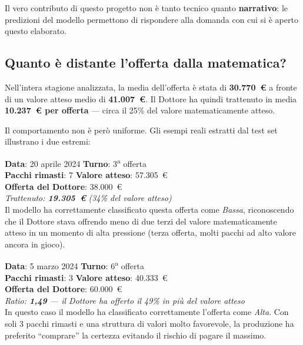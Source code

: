 \documentclass[12pt, a4paper]{article}
\begin{document}
Il vero contributo di questo progetto non è tanto tecnico quanto
\textbf{narrativo}: le predizioni del modello permettono di rispondere
alla domanda con cui si è aperto questo elaborato.

\subsection{Quanto è distante l'offerta dalla matematica?}

Nell'intera stagione analizzata, la media dell'offerta è stata di \textbf{30.770~€}
a fronte di un valore atteso medio di \textbf{41.007~€}. Il Dottore ha quindi
trattenuto in media \textbf{10.237~€ per offerta} — circa il 25\% del valore
matematicamente atteso.

Il comportamento non è però uniforme. Gli esempi reali estratti dal test set
illustrano i due estremi:

\begin{tcolorbox}[colback=rossoat!6, colframe=rossoat!60!black,
  fonttitle=\bfseries\small, title=Offerta classificata come BASSA --- esempio reale]
\small
\textbf{Data}: 20 aprile 2024 \quad \textbf{Turno}: 3\textsuperscript{a} offerta\\
\textbf{Pacchi rimasti}: 7 \quad \textbf{Valore atteso}: 57.305~€\\
\textbf{Offerta del Dottore}: 38.000~€\\
\textit{Trattenuto: \textbf{19.305~€} (34\% del valore atteso)}\\[4pt]
Il modello ha correttamente classificato questa offerta come \textit{Bassa},
riconoscendo che il Dottore stava offrendo meno di due terzi del valore
matematicamente atteso in un momento di alta pressione (terza offerta,
molti pacchi ad alto valore ancora in gioco).
\end{tcolorbox}

\vspace{0.5cm}

\begin{tcolorbox}[colback=verdeat!6, colframe=verdeat!60!black,
  fonttitle=\bfseries\small, title=Offerta classificata come ALTA --- esempio reale]
\small
\textbf{Data}: 5 marzo 2024 \quad \textbf{Turno}: 6\textsuperscript{a} offerta\\
\textbf{Pacchi rimasti}: 3 \quad \textbf{Valore atteso}: 40.333~€\\
\textbf{Offerta del Dottore}: 60.000~€\\
\textit{Ratio: \textbf{1,49} --- il Dottore ha offerto il 49\% in più del valore atteso}\\[4pt]
In questo caso il modello ha classificato correttamente l'offerta come \textit{Alta}.
Con soli 3 pacchi rimasti e una struttura di valori molto favorevole, la
produzione ha preferito ``comprare'' la certezza evitando il rischio di pagare
il massimo.
\end{tcolorbox}
\end{document}
